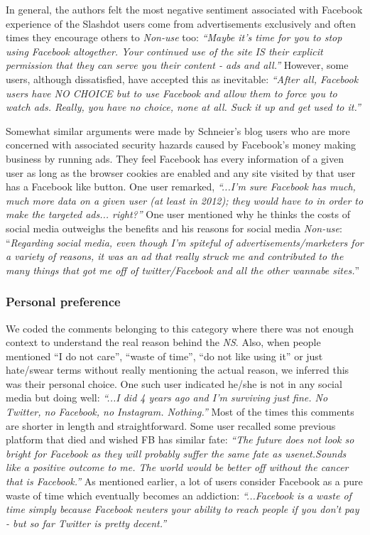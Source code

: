     In general, the authors felt the most negative sentiment associated with Facebook experience of the Slashdot users come from advertisements exclusively and often times they encourage others to \emph{Non-use} too: \textit{``Maybe it's time for you to stop using Facebook altogether. Your continued use of the site IS their explicit permission that they can serve you their content - ads and all.''} However, some users, although dissatisfied, have accepted this as inevitable: \textit{``After all, Facebook users have NO CHOICE but to use Facebook and allow them to force you to watch ads. Really, you have no choice, none at all. Suck it up and get used to it.''}
    
    Somewhat similar arguments were made by Schneier's blog users who are more concerned with associated security hazards caused by Facebook's money making business by running ads. They feel Facebook has every information of a given user as long as the browser cookies are enabled and any site visited by that user has a Facebook like button. One user remarked, \textit{``...I'm sure Facebook has much, much more data on a given user (at least in 2012); they would have to in order to make the targeted ads... right?''} One user mentioned why he thinks the costs of social media outweighs the benefits and his reasons for social media \emph{Non-use}: ``\textit{Regarding social media, even though I'm spiteful of advertisements/marketers for a variety of reasons, it was an ad that really struck me and contributed to the many things that got me off of twitter/Facebook and all the other wannabe sites.}''
    
 \subsubsection{Personal preference}
 We coded the comments belonging to this category where there was not enough context to understand the real reason behind the \emph{NS}. Also, when people mentioned ``I do not care'', ``waste of time'', ``do not like using it'' or just hate/swear terms without really mentioning the actual reason, we inferred this was their personal choice. One such user indicated he/she is not in any social media but doing well: \textit{``...I did 4 years ago and I'm surviving just fine. No Twitter, no Facebook, no Instagram. Nothing.''} Most of the times this comments are shorter in length and straightforward. Some user recalled some previous platform that died and wished FB has similar fate: \textit{``The future does not look so bright for Facebook as they will probably suffer the same fate as usenet.Sounds like a positive outcome to me. The world would be better off without the cancer that is Facebook.''} As mentioned earlier, a lot of users consider Facebook as a pure waste of time which eventually becomes an addiction: \textit{``...Facebook is a waste of time simply because Facebook neuters your ability to reach people if you don't pay - but so far Twitter is pretty decent.''}
     
